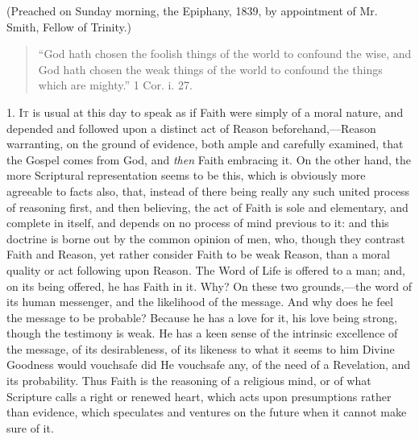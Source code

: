 (Preached on Sunday morning, the Epiphany, 1839, by appointment of
Mr. Smith, Fellow of Trinity.)


\begin{quote}

``God hath chosen the foolish things of the world to confound
the wise, and God hath chosen the weak things of the world to
confound the things which are mighty.'' 1 Cor. i. 27.

\end{quote}

1. I\textsc{t} is usual at this day to speak as if Faith were simply of a
moral nature, and depended and followed upon a distinct act of Reason
beforehand,—Reason warranting, on the ground of evidence, both ample
and carefully examined, that the Gospel comes from God, and \emph{then}
Faith embracing it. On the other hand, the more Scriptural
representation seems to be this, which is obviously more agreeable to
facts also, that, instead of there being really any such united
process of reasoning first, and then believing, the act of Faith is
sole and elementary, and complete in itself, and depends on no process
of mind previous to it: and this doctrine is borne out by the common
opinion of men, who, though they contrast Faith and Reason, yet rather
consider Faith to be weak Reason, than a moral quality or act
following upon Reason. The Word of Life is offered to a man; and, on
its being offered, he has Faith in it. Why? On these two grounds,—the
word of its human messenger, and the likelihood of the message. And
why does he feel the message to be probable? Because he has a love for
it, his love being strong, though the testimony is weak. He has a keen
sense of the intrinsic excellence of the message, of its
desirableness, of its likeness to what it seems to him Divine Goodness
would vouchsafe did He vouchsafe any, of the need of a Revelation, and
its probability. Thus Faith is the reasoning of a religious mind, or
of what Scripture calls a right or renewed heart, which acts upon
presumptions rather than evidence, which speculates and ventures on
the future when it cannot make sure of it.

